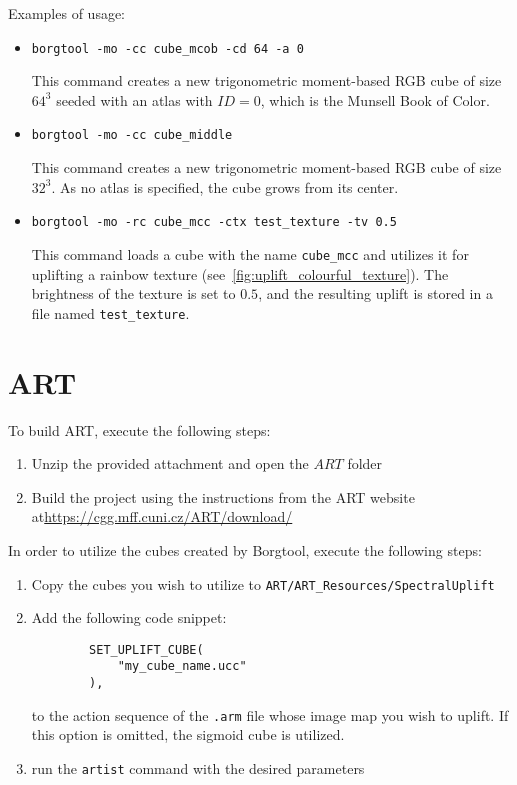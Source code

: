 Examples of usage: 
\begin{itemize}
	\item \texttt{borgtool -mo -cc cube\_mcob -cd 64 -a 0}
	
	This command creates a new trigonometric moment-based RGB cube of size $64^3$ seeded with an atlas with $ID=0$, which is the Munsell Book of Color.
	
	\item \texttt{borgtool -mo -cc cube\_middle}
	
	This command creates a new trigonometric moment-based RGB cube of size $32^3$. As no atlas is specified, the cube grows from its center.
	
	\item \texttt{borgtool -mo -rc cube\_mcc -ctx test\_texture -tv 0.5}
	
	This command loads a cube with the name \texttt{cube\_mcc} and utilizes it for uplifting a rainbow texture (see~\cref{fig:uplift_colourful_texture}). The brightness of the texture is set to $0.5$, and the resulting uplift is stored in a file named \texttt{test\_texture}.

\end{itemize}

\section{ART}
To build ART, execute the following steps:
\begin{enumerate}
	\item Unzip the provided attachment and open the $ART$ folder 
	\item Build the project using the instructions from the ART website at\newline \url{https://cgg.mff.cuni.cz/ART/download/}
\end{enumerate} 

In order to utilize the cubes created by Borgtool, execute the following steps:
\begin{enumerate}
	\item Copy the cubes you wish to utilize to \texttt{ART/ART\_Resources/SpectralUplift}
	\item Add the following code snippet:
	\begin{verbatim}
        SET_UPLIFT_CUBE(
            "my_cube_name.ucc"
        ),
	\end{verbatim}
	to the action sequence of the \texttt{.arm} file whose image map you wish to uplift. If this option is omitted, the sigmoid cube is utilized.
	\item run the \texttt{artist} command with the desired parameters
\end{enumerate}

